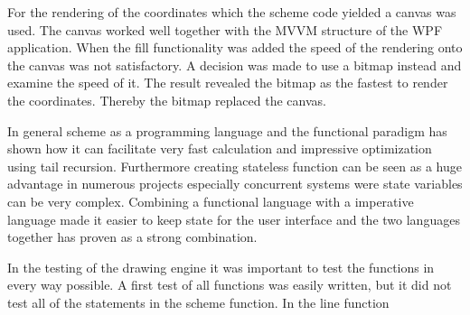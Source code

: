 For the rendering of the coordinates which the scheme code yielded a canvas was used. The canvas worked well together with the MVVM structure of the WPF application. When the fill functionality was added the speed of the rendering onto the canvas was not satisfactory. A decision was made to use a bitmap instead and examine the speed of it. The result revealed the bitmap as the fastest to render the coordinates. Thereby the bitmap replaced the canvas. 

In general scheme as a programming language and the functional paradigm has shown how it can facilitate very fast calculation and impressive optimization using tail recursion. Furthermore creating stateless function can be seen as a huge advantage in numerous projects especially concurrent systems were state variables can be very complex. Combining a functional language with a imperative language made it easier to keep state for the user interface and the two languages together has proven as a strong combination.

In the testing of the drawing engine it was important to test the functions in every way possible. A first test of all functions was easily written, but it did not test all of the statements in the scheme function. In the line function